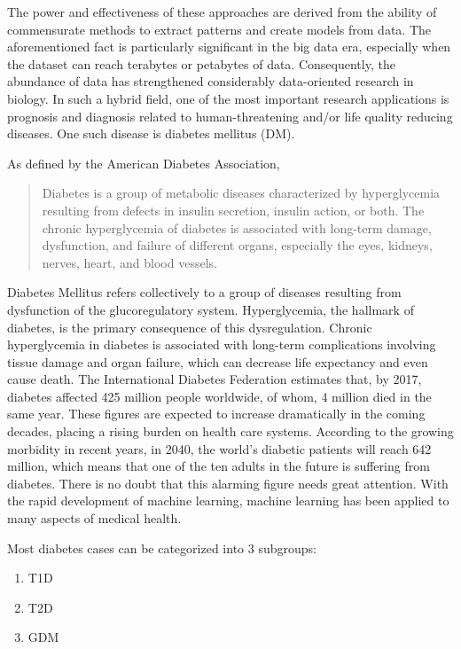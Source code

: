 \documentclass[12pt]{article}
\begin{document}
The power and effectiveness of these approaches are derived from the ability of commensurate methods to extract patterns and create
models from data. The aforementioned fact is particularly significant in the big data era, especially when the dataset can reach terabytes or petabytes of data. Consequently, the abundance of data has strengthened considerably data-oriented research in biology. In such a hybrid field, one of the most important research applications is prognosis and
diagnosis related to human-threatening and/or life quality reducing diseases. One such disease is diabetes mellitus (DM).

As defined by the American Diabetes Association\cite{classdiag},
\begin{quote}
Diabetes is a group of metabolic diseases characterized by hyperglycemia resulting from defects in insulin secretion, insulin action, or both. The chronic hyperglycemia of diabetes is associated with long-term damage, dysfunction, and failure of different organs, especially the eyes, kidneys, nerves, heart, and blood vessels.
\end{quote}


Diabetes Mellitus refers collectively to a group of diseases resulting from dysfunction of the glucoregulatory system. Hyperglycemia, the hallmark of diabetes, is the primary consequence of this dysregulation. Chronic hyperglycemia in diabetes is associated with long-term complications involving tissue damage and organ failure, which can decrease life expectancy and even cause death. The International Diabetes Federation estimates that, by 2017, diabetes affected 425 million people worldwide, of whom, 4 million died in the same year. These figures are expected to increase dramatically in the coming decades, placing a rising burden on health care systems. According to the growing morbidity in recent years, in 2040, the world’s diabetic patients will reach 642 million, which means that one of the ten adults in the future is suffering from diabetes. There is no doubt that this alarming figure needs great attention. With the rapid development of machine learning, machine learning has been applied to many aspects of medical health.\cite{DBTW}

Most diabetes cases can be categorized into 3 subgroups: 
\begin{enumerate}
\item T1D
\item T2D
\item GDM
\end{enumerate}
\end{document}
